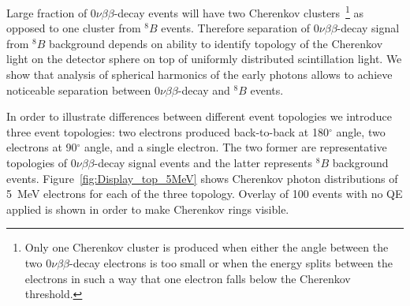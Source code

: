 \documentclass[12pt,twoside,letterpaper]{article}
\newcommand{\vbb}{0\nu\beta\beta}
\newcommand{\B}{^{8}B}
\begin{document}
Large fraction of $\vbb$-decay events will have two Cherenkov clusters~\footnote{Only one Cherenkov cluster is produced when either the angle between the two $\vbb$-decay electrons is too small or when the energy splits between the electrons in such a way that one electron falls below the Cherenkov threshold.} as opposed to one cluster from $\B$ events. Therefore separation of $\vbb$-decay signal from $\B$ background depends on ability to identify topology of the Cherenkov light on the detector sphere on top of uniformly distributed scintillation light. We show that analysis of spherical harmonics of the early photons allows to achieve noticeable separation between $\vbb$-decay and $\B$ events.




In order to illustrate differences between different event topologies we introduce three event topologies: two electrons produced back-to-back at 180$^{\circ}$ angle, two electrons at 90$^{\circ}$ angle, and a single electron. The two former are representative topologies of $\vbb$-decay signal events and the latter represents $\B$ background events. Figure~\ref{fig:Display_top_5MeV} shows Cherenkov photon distributions of 5~MeV electrons for each of the three topology. Overlay of 100 events with no QE applied is shown in order to make Cherenkov rings visible.
\end{document}
